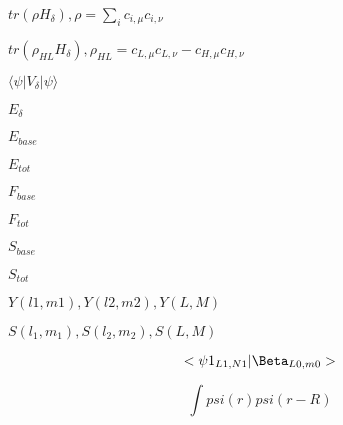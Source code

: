\documentclass{article}
\begin{document}
$tr(\rho H_\delta), \rho = \sum_i{c_{i, \mu}c_{i,\nu}} $
\pagebreak

$tr(\rho_{HL} H_\delta), \rho_{HL} = c_{L, \mu}c_{L,\nu} - c_{H, \mu}c_{H,\nu} $
\pagebreak

$\langle\psi|V_\delta|\psi\rangle$
\pagebreak

$E_{\delta}$
\pagebreak

$E_{base}$
\pagebreak

$E_{tot}$
\pagebreak

$F_{base}$
\pagebreak

$F_{tot}$
\pagebreak

$S_{base}$
\pagebreak

$S_{tot}$
\pagebreak

$ Y(l1,m1), Y(l2,m2), Y(L,M) $
\pagebreak

$ S(l_1,m_1), S(l_2,m_2), S(L,M) $
\pagebreak

\[ <\psi1_{L1,N1}|\Beta_{L0,m0}> \]
\pagebreak

\[ \int psi(r) psi(r-R)\]
\pagebreak
\end{document}
